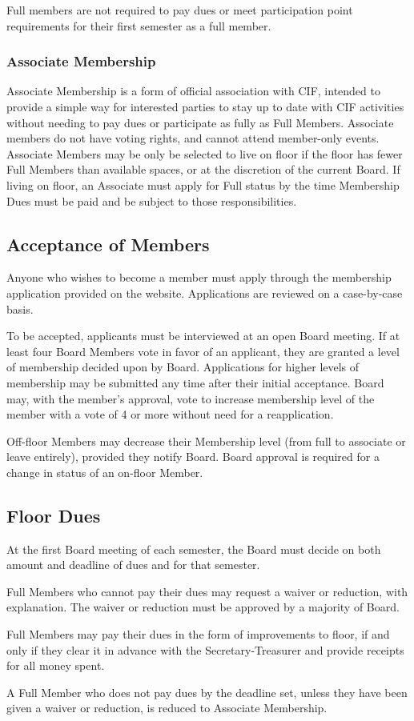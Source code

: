 		Full members are not required to pay dues or meet participation point requirements for their first semester as a full member.



		\subsubsection{Associate Membership}

		Associate Membership is a form of official association with CIF, intended to provide a simple way for interested parties to stay up to date with CIF activities without needing to pay dues or participate as fully as Full Members. Associate members do not have voting rights, and cannot attend member-only events. Associate Members may be only be selected to live on floor if the floor has fewer Full Members than available spaces, or at the discretion of the current Board. If living on floor, an Associate must apply for Full status by the time Membership Dues must be paid and be subject to those responsibilities.



	\subsection{Acceptance of Members}

	Anyone who wishes to become a member must apply through the membership application provided on the website. Applications are reviewed on a case-by-case basis.

	To be accepted, applicants must be interviewed at an open Board meeting. If at least four Board Members vote in favor of an applicant, they are granted a level of membership decided upon by Board. Applications for higher levels of membership may be submitted any time after their initial acceptance. Board may, with the member's approval, vote to increase membership level of the member with a vote of 4 or more without need for a reapplication.

	Off-floor Members may decrease their Membership level (from full to associate or leave entirely), provided they notify Board. Board approval is required for a change in status of an on-floor Member.



	\subsection{Floor Dues}

	At the first Board meeting of each semester, the Board must decide on both amount and deadline of dues and for that semester.

	Full Members who cannot pay their dues may request a waiver or reduction, with explanation. The waiver or reduction must be approved by a majority of Board.

	Full Members may pay their dues in the form of improvements to floor, if and only if they clear it in advance with the Secretary-Treasurer and provide receipts for all money spent.

	A Full Member who does not pay dues by the deadline set, unless they have been given a waiver or reduction, is reduced to Associate Membership.
